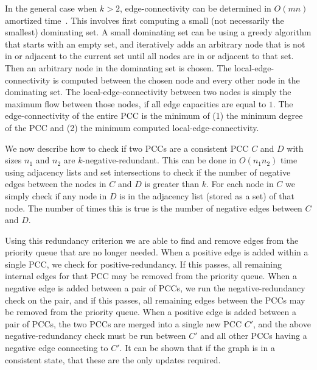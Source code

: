 In the general case when $k>2$, edge-connectivity can be determined in $O(m n)$ amortized
  time~\cite{esfahanian_connectivity_2017}.
This involves first computing a small (not necessarily the smallest) dominating set.
A small dominating set can be using a greedy algorithm that starts with an empty set, and iteratively adds an
  arbitrary node that is not in or adjacent to the current set until all nodes are in or adjacent to that set.
Then an arbitrary node in the dominating set is chosen.
The local-edge-connectivity is computed between the chosen node and every other node in the dominating set.
The local-edge-connectivity between two nodes is simply the maximum flow between those nodes, if all edge
  capacities are equal to $1$.
The edge-connectivity of the entire PCC is the minimum of
(1) the minimum degree of the PCC and
(2) the minimum computed local-edge-connectivity.


We now describe how to check if two PCCs are a consistent PCC  $C$ and $D$ with sizes $n_1$ and $n_2$ are
  $k$-negative-redundant.
This can be done in $O(n_1 n_2)$ time using adjacency lists and set intersections to check if the number of
  negative edges between the nodes in $C$ and $D$ is greater than $k$.
For each node in $C$ we simply check if any node in $D$ is in the adjacency list (stored as a set) of that node.
The number of times this is true is the number of negative edges between $C$ and $D$.


Using this redundancy criterion we are able to find and remove edges from the priority queue that are no longer
  needed.
When a positive edge is added within a single PCC, we check for positive-redundancy.
If this passes, all remaining internal edges for that PCC may be removed from the priority queue.
When a negative edge is added between a pair of PCCs, we run the negative-redundancy check on the pair, and if
  this passes, all remaining edges between the PCCs may be removed from the priority queue.
When a positive edge is added between a pair of PCCs, the two PCCs are merged into a single new PCC $C'$, and the
  above negative-redundancy check must be run between $C'$ and all other PCCs having a negative edge connecting to
  $C'$.
It can be shown that if the graph is in a consistent state, that these are the only updates required.

